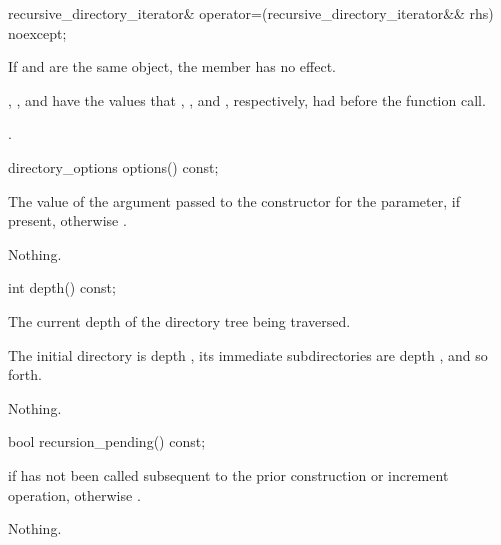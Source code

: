 %
\begin{itemdecl}
recursive_directory_iterator& operator=(recursive_directory_iterator&& rhs) noexcept;
\end{itemdecl}

\begin{itemdescr}
\pnum
\effects If  and  are the same
object, the member has no effect.

\pnum
\ensures {}, ,
and  have the values that ,
, and , respectively, had before the function call.

\pnum
\returns {}.
\end{itemdescr}

%
\begin{itemdecl}
directory_options options() const;
\end{itemdecl}

\begin{itemdescr}
\pnum
\returns The value of the argument passed to the constructor for the
 parameter, if present, otherwise
.

\pnum
\throws Nothing.
\end{itemdescr}

%
\begin{itemdecl}
int depth() const;
\end{itemdecl}

\begin{itemdescr}
\pnum
\returns The current depth of the directory tree being traversed. \begin{note}
  The initial directory is depth , its immediate subdirectories are depth ,
  and so forth. \end{note}

\pnum
\throws Nothing.
\end{itemdescr}

%
\begin{itemdecl}
bool recursion_pending() const;
\end{itemdecl}

\begin{itemdescr}
\pnum
\returns {} if 
  has not been called subsequent to the prior construction or increment
  operation, otherwise .

\pnum
\throws Nothing.
\end{itemdescr}

